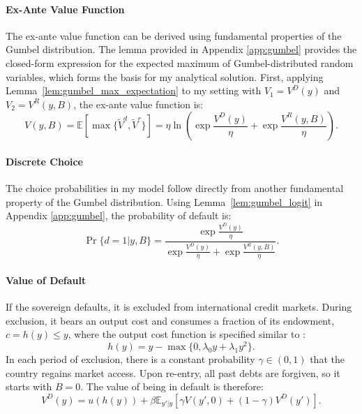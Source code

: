 \documentclass[12pt]{article}
\theoremstyle{plain}
\begin{document}
\paragraph{Ex-Ante Value Function}
The ex-ante value function can be derived using fundamental properties of the
Gumbel distribution. The lemma provided in Appendix \ref{app:gumbel} provides
the closed-form expression for the expected maximum of Gumbel-distributed
random variables, which forms the basis for my analytical solution. First,
applying Lemma~\ref{lem:gumbel_max_expectation} to my setting with $V_1 =
	V^D(y)$ and $V_2 = V^R(y, B)$, the ex-ante value function is:
\begin{equation}\label{eq:V_choice}
	V(y, B) = \mathbb{E}\left[\max\{\tilde{V}^d, \tilde{V}^r\}\right] = \eta \ln\left( \exp\frac{V^D(y)}{\eta} + \exp\frac{V^R(y, B)}{\eta} \right).
\end{equation}

\paragraph{Discrete Choice}
The choice probabilities in my model follow directly from another fundamental
property of the Gumbel distribution. Using Lemma~\ref{lem:gumbel_logit} in
Appendix \ref{app:gumbel}, the probability of default is:
\begin{equation}\label{eq:prd_1}
	\Pr\{d=1 | y, B\} = \frac{\exp\frac{V^D(y)}{\eta}}{\exp\frac{V^D(y)}{\eta} + \exp\frac{V^R(y, B)}{\eta}}.
\end{equation}

\paragraph{Value of Default}
If the sovereign defaults, it is excluded from international credit markets.
During exclusion, it bears an output cost and consumes a fraction of its
endowment, $c = h(y) \le y$, where the output cost function is specified
similar to \citet{ChatterjeeEyigungor2012}:
\begin{equation}
	h(y) = y - \max\{0, \lambda_0 y + \lambda_1 y^2\}.
\end{equation}
In each period of exclusion, there is a constant probability $\gamma \in (0, 1)$ that the country regains market access. Upon re-entry, all past debts are forgiven, so it starts with $B=0$. The value of being in default is therefore:
\begin{equation}
	V^D(y) = u(h(y)) + \beta \mathbb{E}_{y'|y} \left[ \gamma V(y', 0) + (1-\gamma) V^D(y') \right].
	\label{eq:Vd}
\end{equation}
\end{document}
